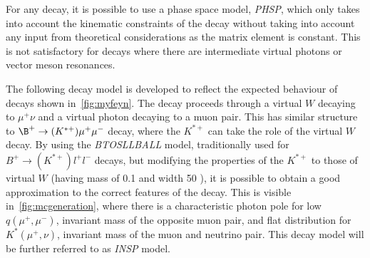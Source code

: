 For any decay, it is possible to use a phase space model, \textit{PHSP}, which only takes into account the kinematic constraints of the decay without taking into account any input from theoretical considerations as the matrix element is constant. This is not satisfactory for decays where there are intermediate virtual photons or vector meson resonances.

The following decay model is developed to reflect the expected behaviour of decays shown in~\autoref{fig:myfeyn}. The decay proceeds through a virtual $W$ decaying to $\mu^{+} \nu$ and a virtual photon decaying to a muon pair. This has similar structure to $\B^{+} \rightarrow (K^{*+}) \mu^{+} \mu^{-}$ decay, where the $K^{*+}$ can take the role of the virtual $W$ decay. By using the \textit{BTOSLLBALL} model\cite{Ali:1999mm}, traditionally used for $B^{+} \rightarrow (K^{*+}) l^{+} l^{-}$ decays, but modifying the properties of the $K^{*+}$ to those of virtual $W$ (having mass of 0.1 \gevcc and width 50 \gev), it is possible to obtain a good approximation to the correct features of the decay. This is visible in~\autoref{fig:mcgeneration}, where there is a characteristic photon pole for low $q(\mu^{+},\mu^{-})$, invariant mass of the opposite muon pair, and flat distribution for $K^{*}(\mu^{+}, \nu) $, invariant mass of the muon and neutrino pair. This decay model will be further referred to as \textit{INSP} model. 




